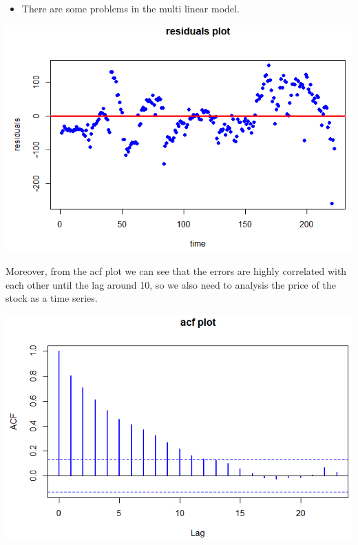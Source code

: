 \documentclass[a0,portrait]{a0poster}
\begin{document}
\begin{multicols}{3}
\begin{itemize}
    
\item There are some problems in the multi linear model.
\end{itemize}
\begin{center}
\includegraphics[width=1.0\linewidth]{res.png}
\end{center}
 Moreover, from the acf plot we can see that the errors are highly correlated with each other until the lag around 10, so we also need to analysis the price of the stock as a time series. 
\begin{center}
\includegraphics[width=1.0\linewidth]{acf.png}
\end{center}



\end{multicols}
\end{document}
